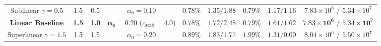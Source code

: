 \documentclass[VANCOUVER]{USG}
\begin{document}
\begin{table}[!t]
{\begin{tabular}{ccccccccc}
            Sublinear $\gamma = 0.5$   & 1.5                  & 0.5                   & $\alpha_0 = 0.10$    & $0.78\%$                             & $1.35 / 1.88$                                                     & $0.79\%$                               & $1.17 / 1.16$                                                     & $7.83\times 10^6$ / $5.34\times 10^7$                      \\
            \textbf{Linear Baseline}   & \textbf{1.5}         & \textbf{1.0}          & $\boldsymbol{\alpha_0 = 0.20}$ ($c_{\mathrm{stab}} = 4.0$) & $\mathbf{0.78\%}$ & $\mathbf{1.72} / \mathbf{2.48}$                & $\mathbf{0.79\%}$                      & $\mathbf{1.61} / \mathbf{1.62}$                                   & $\mathbf{7.83\times 10^6}$ / $\mathbf{5.34\times 10^7}$    \\
            Superlinear $\gamma = 1.5$ & 1.5                  & 1.5                   & $\alpha_0 = 0.20$    & $0.89\%$                             & $1.83 / 1.77$                                                     & $1.99\%$                               & $1.31 / 0.00$                                                     & $8.04\times 10^6$ / $5.50\times 10^7$                      \\
            \bottomrule
        \end{tabular}
    }
\end{table}
\end{document}
